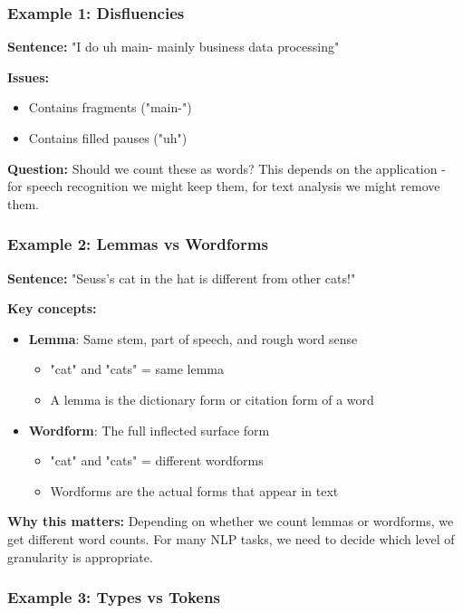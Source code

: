 \documentclass[11pt,a4paper]{article}
\theoremstyle{definition}
\theoremstyle{plain}
\theoremstyle{remark}
\begin{document}
\subsubsection{Example 1: Disfluencies}

\textbf{Sentence:} "I do uh main- mainly business data processing"

\textbf{Issues:}
\begin{itemize}
    \item Contains fragments ("main-")
    \item Contains filled pauses ("uh")
\end{itemize}

\textbf{Question:} Should we count these as words? This depends on the application - for speech recognition we might keep them, for text analysis we might remove them.

\subsubsection{Example 2: Lemmas vs Wordforms}

\textbf{Sentence:} "Seuss's cat in the hat is different from other cats!"

\textbf{Key concepts:}

\begin{itemize}
    \item \textbf{Lemma}: Same stem, part of speech, and rough word sense
    \begin{itemize}
        \item "cat" and "cats" = same lemma
        \item A lemma is the dictionary form or citation form of a word
    \end{itemize}
    
    \item \textbf{Wordform}: The full inflected surface form
    \begin{itemize}
        \item "cat" and "cats" = different wordforms
        \item Wordforms are the actual forms that appear in text
    \end{itemize}
\end{itemize}

\textbf{Why this matters:} Depending on whether we count lemmas or wordforms, we get different word counts. For many NLP tasks, we need to decide which level of granularity is appropriate.

\subsubsection{Example 3: Types vs Tokens}
\end{document}
